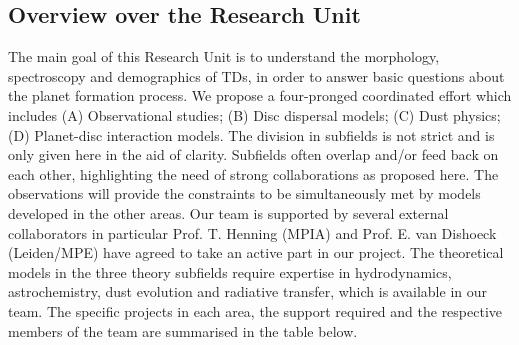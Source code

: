 \documentclass[10pt,fleqn,twoside]{article}
\begin{document}
\subsection{Overview over the Research Unit}
%
The main goal of this Research Unit is to understand the morphology,
spectroscopy and demographics of TDs, in order to answer
basic questions about the planet formation process. We propose a
four-pronged coordinated effort which includes (A) Observational
studies; (B) Disc dispersal models; (C) Dust physics; (D) Planet-disc
interaction models. The division in subfields is not strict and is
only given here in the aid of clarity. Subfields often overlap and/or
feed back on each other, highlighting the need of strong
collaborations as proposed here. The observations will provide the
constraints to be simultaneously met by models developed in the other
areas. Our team is supported by several external collaborators in particular
Prof. T. Henning (MPIA) and Prof. E. van Dishoeck (Leiden/MPE) have
agreed to take an active part in our project. The theoretical models in the three theory subfields require
expertise in hydrodynamics, astrochemistry, dust evolution and
radiative transfer, which is available in our team. The specific
projects in each area, the support required and the respective members
of the team are summarised in the table below. 
\vspace{1.5em}
\end{document}
